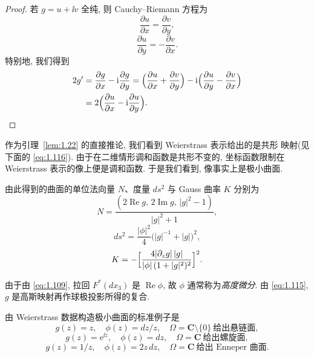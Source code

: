 \begin{proof}
若 $g=u+\ii v$ 全纯, 则 Cauchy--Riemann 方程为
\begin{equation}
\frac{\partial u}{\partial x}=\frac{\partial v}{\partial y},
\label{eq:1.112}
\end{equation}
\begin{equation}
\frac{\partial u}{\partial y}=-\frac{\partial v}{\partial x}.
\label{eq:1.113}
\end{equation}
特别地, 我们得到
\begin{equation}
\begin{aligned}
2g'&=\frac{\partial g}{\partial x}-\mathrm{i}\frac{\partial g}{\partial y}
 =\Bigl(\frac{\partial u}{\partial x}+\frac{\partial v}{\partial y}\Bigr)
 -\mathrm{i}\Bigl(\frac{\partial u}{\partial y}-\frac{\partial v}{\partial x}\Bigr)\\
&=2\Bigl(\frac{\partial u}{\partial x}
 -\mathrm{i}\frac{\partial u}{\partial y}\Bigr).
\end{aligned}
\label{eq:1.114}
\end{equation}
\end{proof}

{\setlength{\emergencystretch}{2em}%
作为引理~\ref{lem:1.22} 的直接推论, 我们看到 Weierstrass 表示给出的是共形
映射(见下面的 \eqref{eq:1.116}). 由于在二维情形调和函数是共形不变的, 坐标函数限制在
Weierstrass 表示的像上便是调和函数. 于是我们看到, 像事实上是极小曲面.\par}

由此得到的曲面的单位法向量 $N$、度量 $ds^2$ 与 Gauss 曲率 $K$ 分别为
\begin{equation}
N=\frac{(2\operatorname{Re}g,\,2\operatorname{Im}g,\,|g|^2-1)}{|g|^2+1},
\label{eq:1.115}
\end{equation}
\begin{equation}
ds^2=\frac{|\phi|^2}{4}\bigl(|g|^{-1}+|g|\bigr)^2,
\label{eq:1.116}
\end{equation}
\begin{equation}
K=-\Bigl[\frac{4|\partial_z g|\,|g|}{|\phi|\,(1+|g|^2)^2}\Bigr]^2.
\label{eq:1.117}
\end{equation}

由于由 \eqref{eq:1.109}, 拉回 $F^{*}(dx_3)$ 是 $\operatorname{Re}\phi$, 故 $\phi$
通常称为\emph{高度微分}. 由 \eqref{eq:1.115}, $g$ 是高斯映射再作球极投影所得的复合.

由 Weierstrass 数据构造极小曲面的标准例子是
\begin{equation}
g(z)=z,\quad\phi(z)=dz/z,\quad
\Omega=\mathbf{C}\setminus\{0\}\ \text{给出悬链面},
\label{eq:1.118}
\end{equation}
\begin{equation}
g(z)=\mathrm{e}^{\ii z},\quad\phi(z)=dz,\quad
\Omega=\mathbf{C}\ \text{给出螺旋面},
\label{eq:1.119}
\end{equation}
\begin{equation}
g(z)=1/z,\quad\phi(z)=2z\,dz,\quad
\Omega=\mathbf{C}\ \text{给出 Enneper 曲面}.
\label{eq:1.120}
\end{equation}

